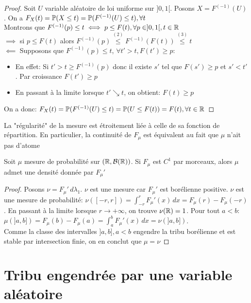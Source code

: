 \documentclass[]{report}
\begin{document}
    \begin{proof}
        Soit $U$ variable aléatoire de loi uniforme sur $]0,1[$. Posons $X=F^{(-1)}(U)$. On a $F_X(t)=\mathbb{P}(X\le t)=\mathbb{P}(F^{(-1)}(U)\le t),\forall t$\\
        Montrons que $F^{(-1)}(p)\le t\iff p\le F(t),\forall p\in]0,1[,t\in \mathbb{R}$\\
        $\implies$ si $p\le F(t)$ alors $F^{(-1)}(p)\overset{(2)}{\le} F^{(-1)}(F(t))\overset{(3)}{\le} t$\\
        $\impliedby$ Supposons que $F^{(-1)}(p)\le t$, $\forall t'>t,F(t')\ge p$:
        \begin{itemize}
            \item En effet: Si $t'>t\ge F^{(-1)}(p)$ donc il existe $s'$ tel que $F(s')\ge p$ et $s'<t'$. Par croissance $F(t')\ge p$
            \item En passant à la limite lorsque $t'\searrow t$, on obtient: $F(t)\ge p$
        \end{itemize}
        On a donc: $F_X(t)=\mathbb{P}(F^{(-1)}(U)\le t)=\mathbb{P}(U\le F(t))=F(t),\forall t\in \mathbb{R}$
    \end{proof}

    \begin{re}{}{}
        La "régularité" de la mesure est étroitement liée à celle de sa fonction de répartition. En particulier, la continuité de $F_\mu$ est équivalent au fait que $\mu$ n'ait pas d'atome
    \end{re}

    \begin{prop}{}{}
        Soit $\mu$ mesure de probabilité sur $(\mathbb{R},\mathcal{B}(\mathbb{R}))$. Si $F_\mu$ est $C^1$ par morceaux, alors $\mu$ admet une densité donnée par $F_\mu'$
    \end{prop}

    \begin{proof}
        Posons $\nu=F_\mu'\,d\lambda_1$. $\nu$ est une mesure car $F_\mu'$ est borélienne positive. $\nu$ est une mesure de probabilité: $\nu([-r,r])=\int_{-r}^{r}F_\mu'(x)\,dx=F_\mu(r)-F_\mu(-r)$. En passant à la limite lorsque $r\to+\infty$, on trouve $\nu(\mathbb{R})=1$. Pour tout $a<b$:\\
        $\mu(]a,b])=F_\mu(b)-F_\mu(a)=\int_{a}^{b} F_\mu'(x)\,dx=\nu(]a,b])$.\\
        Comme la classe des intervalles $]a,b],a<b$ engendre la tribu borélienne et est stable par intersection finie, on en conclut que $\mu=\nu$
    \end{proof}

    \section{Tribu engendrée par une variable aléatoire}
\end{document}
